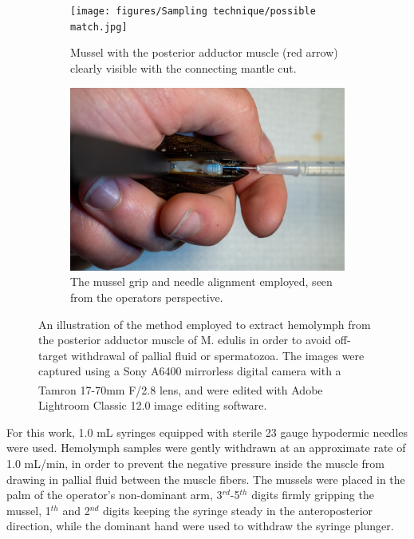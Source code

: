 \begin{figure}[H]
\begin{subfigure}[b]{.45\textwidth}
        \centering
        \texttt{[image: figures/Sampling technique/possible match.jpg]}
        \caption{Mussel with the posterior adductor muscle (red arrow) clearly visible with the connecting mantle cut.}
        \label{sfig:c}
    \end{subfigure}
    \hfill
    \begin{subfigure}[b]{.45\textwidth}
        \centering
        \includegraphics[width=\textwidth]{figures/Sampling technique/hands colors centered.jpg}
        \caption{The mussel grip and needle alignment employed, seen from the operators perspective.}
        \label{sfig:d}
    \end{subfigure}
    \caption{An illustration of the method employed to extract hemolymph from the posterior adductor muscle of M. edulis in order to avoid off-target withdrawal of pallial fluid or spermatozoa. The images were captured using a Sony A6400 mirrorless digital camera with a Tamron 17-70mm F/2.8 lens, and were edited with Adobe\textsuperscript{\textregistered} Lightroom Classic 12.0 image editing software.}
    \label{fig:Hemolymph_sampling_illustration}
\end{figure}

For this work, 1.0 mL syringes equipped with sterile 23 gauge hypodermic needles were used. Hemolymph samples were gently withdrawn at an approximate rate of 1.0 mL/min, in order to prevent the negative pressure inside the muscle from drawing in pallial fluid between the muscle fibers. The mussels were placed in the palm of the operator's non-dominant arm, 3$^{rd}$-5$^{th}$ digits firmly gripping the mussel, 1$^{th}$ and 2$^{nd}$ digits keeping the syringe steady in the anteroposterior direction, while the dominant hand were used to withdraw the syringe plunger.

